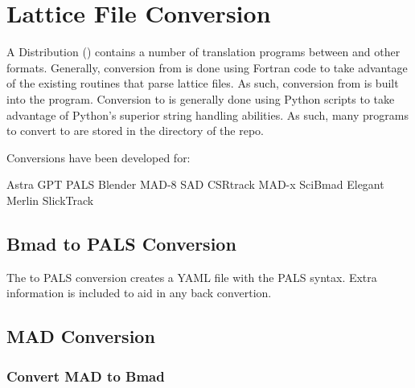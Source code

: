 \chapter{Lattice File Conversion}
\label{c:lat.convert}

A \bmad Distribution () contains a number of translation programs between \bmad
and other formats. Generally, conversion from \bmad is done using Fortran code to take advantage of
the existing routines that parse \bmad lattice files. As such, conversion from \bmad is built into
the \tao program. Conversion to \bmad is generally done using Python scripts to take advantage of
Python's superior string handling abilities. As such, many programs to convert to \bmad are stored
in the  directory of the \bmad repo.

Conversions have been developed for:
\begin{example}
  Astra       GPT       PALS
  Blender     MAD-8     SAD       
  CSRtrack    MAD-x     SciBmad   
  Elegant     Merlin    SlickTrack
\end{example}

\section{Bmad to PALS Conversion}
\label{s:bmad.pals.convert}

The \bmad to PALS conversion creates a YAML file with the PALS syntax. 
Extra information is included to aid in any back convertion. 


\section{MAD Conversion}
\label{s:mad.convert}

\subsection{Convert MAD to Bmad}
\label{s:mad.bmad.uap}

